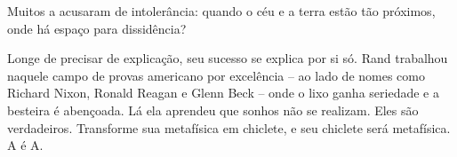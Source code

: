  \par 
Muitos a acusaram de intolerância: quando o céu e a terra estão tão próximos, onde há espaço para dissidência?
 \par 
Longe de precisar de explicação, seu sucesso se explica por si só. Rand trabalhou naquele campo de provas americano por excelência – ao lado de nomes como Richard Nixon, Ronald Reagan e Glenn Beck – onde o lixo ganha seriedade e a besteira é abençoada. Lá ela aprendeu que sonhos não se realizam. Eles são verdadeiros. Transforme sua metafísica em chiclete, e seu chiclete será metafísica. A é A.